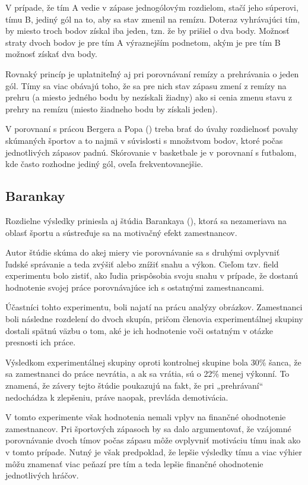 \documentclass[
  digital, %
  twoside, %
  notable,   %
  lof,     %
  lot,     %
]{fithesis3}
\begin{document}
		V prípade, že tím A vedie v zápase jednogólovým rozdielom, stačí jeho súperovi, tímu B, jediný gól na to, aby sa stav zmenil na remízu. Doteraz vyhrávajúci tím, by miesto troch bodov získal iba jeden, tzn. že by prišiel o dva body. Možnosť straty dvoch bodov je pre tím A výraznejším podnetom, akým je pre tím B možnosť získať dva body. 
	
		Rovnaký princíp je uplatniteľný aj pri porovnávaní remízy a prehrávania o jeden gól. Tímy sa viac obávajú toho, že sa pre nich stav zápasu zmení z remízy na prehru (a miesto jedného bodu by nezískali žiadny) ako si cenia zmenu stavu z prehry na remízu (miesto žiadneho bodu by získali jeden). \parencite[s.~1768]{schneemann2017}
		
		V porovnaní s prácou Bergera a Popa (\citeyear{berger2011}) treba brať do úvahy rozdielnosť povahy skúmaných športov a to najmä v súvislosti s množstvom bodov, ktoré počas jednotlivých zápasov padnú. Skórovanie v basketbale je v porovnaní s futbalom, kde často rozhodne jediný gól, oveľa frekventovanejšie.
		
		\subsection{Barankay}
		Rozdielne výsledky priniesla aj štúdia Barankaya (\citeyear{barankay2010}), ktorá sa nezameriava na oblasť športu a sústreďuje sa na motivačný efekt zamestnancov. 
		
		Autor štúdie skúma do akej miery vie porovnávanie sa s druhými ovplyvniť ľudské správanie a teda zvýšiť alebo znížiť snahu a výkon. Cieľom tzv. field experimentu bolo zistiť, ako ľudia prispôsobia svoju snahu v prípade, že dostanú hodnotenie svojej práce porovnávajúce ich s ostatnými zamestnancami. 
		
		Účastníci tohto experimentu, boli najatí na prácu analýzy obrázkov. Zamestnanci boli následne rozdelení do dvoch skupín, pričom členovia experimentálnej skupiny dostali spätnú väzbu o tom, aké je ich hodnotenie voči ostatným v otázke presnosti ich práce. 
		
		Výsledkom experimentálnej skupiny oproti kontrolnej skupine bola 30\% šanca, že sa zamestnanci do práce nevrátia, a ak sa vrátia, sú o 22\% menej výkonní. To znamená, že závery tejto štúdie poukazujú na fakt, že pri „prehrávaní“ nedochádza k zlepšeniu, práve naopak, prevláda demotivácia. \parencite[s.~4]{barankay2010}
		
		V tomto experimente však hodnotenia nemali vplyv na finančné ohodnotenie zamestnancov. Pri športových zápasoch by sa dalo argumentovať, že vzájomné porovnávanie dvoch tímov počas zápasu môže ovplyvniť motiváciu tímu inak ako v tomto prípade. Nutný je však predpoklad, že lepšie výsledky tímu a viac výhier môžu znamenať viac peňazí pre tím a teda lepšie finančné ohodnotenie jednotlivých hráčov.
		
\end{document}

